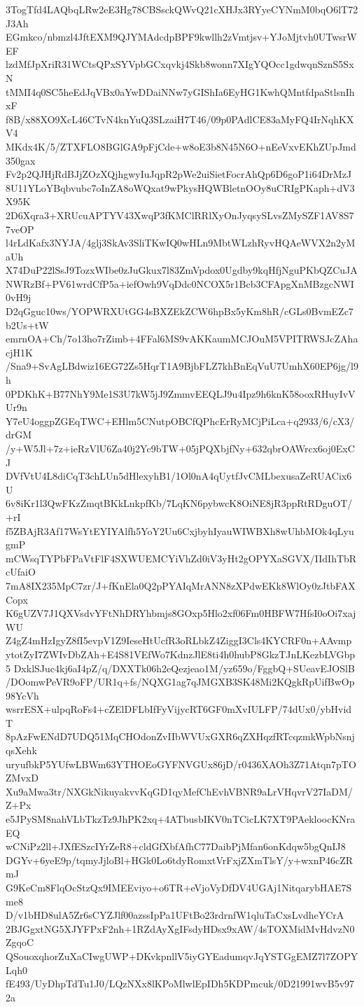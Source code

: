 3TogTfd4LAQbqLRw2eE3Hg78CBSsckQWvQ21cXHJx3RYyeCYNmM0bqO6lT72J3Ah
EGmkco/nbmzl4JftEXM9QJYMAdcdpBPF9kwllh2zVmtjsv+YJoMjtvh0UTwsrWEF
lzdMfJpXriR31WCtsQPxSYVpbGCxqvkj4Skb8wonn7XIgYQOcc1gdwqnSznS5SxN
tMMI4q0SC5heEdJqVBx0aYwDDaiNNw7yGIShIa6EyHG1KwhQMntfdpaStlsnIhxF
f8B/x88XO9XcL46CTvN4knYuQ3SLzaiH7T46/09p0PAdlCE83aMyFQ4IrNqhKXV4
MKdx4K/5/ZTXFLO8BGlGA9pFjCde+w8oE3b8N45N6O+nEeVxvEKhZUpJmd350gax
Fv2p2QJHjRdBJjZOzXQjhgwyIuJqpR2pWe2uiSietFocrAhQp6D6goP1i64DrMzJ
8U11YLoYBqbvubc7oInZA8oWQxat9wPkysHQWBletnOOy8uCRIgPKaph+dV3X95K
2D6Xqra3+XRUcuAPTYV43XwqP3fKMClRRlXyOnJyqsySLvsZMySZF1AV8S77veOP
l4rLdKafx3NYJA/4glj3SkAv3SliTKwIQ0wHLn9MbtWLzhRyvHQAeWVX2n2yMaUh
X74DuP22lSsJ9TozxWIbe0zJuGkux7l83ZmVpdox0Ugdby9kqHfjNguPKbQZCuJA
NWRzBf+PV61wrdCfP5a+iefOwh9VqDdc0NCOX5r1Bcb3CFApgXnMBzgcNWI0vH9j
D2qGguc10ws/YOPWRXUtGG4sBXZEkZCW6hpBx5yKm8hR/cGLs0BvmEZc7b2Us+tW
emrnOA+Ch/7o13ho7rZimb+4FFal6MS9vAKKaumMCJOuM5VPITRWSJcZAhacjH1K
/Sna9+SvAgLBdwiz16EG72Zs5HqrT1A9BjbFLZ7khBnEqVuU7UmhX60EP6jg/l9h
0PDKhK+B77NhY9Me1S3U7kW5jJ9ZmmvEEQLJ9u4Ipz9h6knK58ooxRHuyIvVUr9n
Y7eU4oggpZGEqTWC+EHlm5CNutpOBCfQPhcErRyMCjPiLca+q2933/6/cX3/drGM
/y+W5Jl+7z+ieRzVlU6Za40j2Yc9bTW+05jPQXbjfNy+632qbrOAWrcx6oj0ExCJ
DVfVtU4L8diCqT3chLUn5dHlexyhB1/1Ol0nA4qUytfJvCMLbexusaZeRUACix6U
6v8iKr1l3QwFKzZmqtBKkLnkpfKb/7LqKN6pybwcK8OiNE8jR3ppRtRDguOT/+rI
f5ZBAjR3Af17WsYtEYIYAlfh5YoY2Uu6CxjbyhIyauWIWBXh8wUhbMOk4qLyugmP
mCWsqTYPbFPaVtFlF4SXWUEMCYiVhZd0iV3yHt2gOPYXaSGVX/IIdIhTbRcUfaiO
7mA8IX235MpC7zr/J+fKnEla0Q2pPYAIqMrANN8zXPdwEKk8WlOy0zJtbFAXCopx
K6gUZV7J1QXVsdvYFtNhDRYhbmjs8GOxp5Hlo2xf06Fm0HBFW7HfsI0oOi7xajWU
Z4gZ4mHzIgyZ8fI5evpV1Z9IeseHtUcfR3oRLbkZ4ZiggI3Cls4KYCRF0n+AAvmp
ytotZyI7ZWIvDbZAh+E4S81VEfWo7KdnzJlE8ti4h0hubP8GkzTJnLKezbLVGbp5
DxklSJuc4kj6aI4pZ/q/DXXTk06h2eQezjeao1M/yz659o/FggbQ+SUeavEJOSlB
/DOomwPeVR9oFP/UR1q+fs/NQXG1ag7qJMGXB3SK48Mi2KQgkRpUifBwOp98YcVh
wsrrESX+ulpqRoFs4+cZElDFLbIfFyVijycRT6GF0mXvIULFP/74dUx0/ybHvidT
8pAzFwENdD7UDQ51MqCHOdonZvIIbWVUxGXR6qZXHqzfRTcqzmkWpbNsnjqsXehk
uryufbkP5YUfwLBWm63YTHOEoGYFNVGUx86jD/r0436XAOh3Z71Atqn7pTOZMvxD
Xu9aMwa3tr/NXGkNikuyakvvKqGD1qyMefChEvhVBNR9aLrVHqvrV27IaDM/Z+Px
e5JPySM8nahVLbTkzTz9JhPK2xq+4ATbusbIKV0nTCicLK7XT9PAekloocKNraEQ
wCNiPz2ll+JXfESzcIYrZeR8+cldGfXbfAfhC77DaibPjMfan6onKdqw5bgQnIJ8
DGYv+6yeE9p/tqmyJjloBl+HGk0Lo6tdyRomxtVrFxjZXmTlsY/y+wxnP46cZRmJ
G9KeCm8FlqOcStzQx9IMEEviyo+o6TR+eVjoVyDfDV4UGAj1NitqarybHAE7Sme8
D/v1bHD8ulA5Zr6sCYZJlf00azssIpPa1UFtBo23rdrnfW1qluTaCxsLvdheYCrA
2BJGgxtNG5XJYFPxF2nh+1RZdAyXgIFsdyHDsx9xAW/4sTOXMidMvHdvzN0ZgqoC
QSouoxqhorZuXaCIwgUWP+DKvkpnllV5iyGYEadumqvJqYSTGgEMZ7l7ZOPYLqh0
fE493/UyDhpTdTu1J0/LQzNXx8lKPoMlwlEpIDh5KDPmcuk/0D21991wvB5v972a
